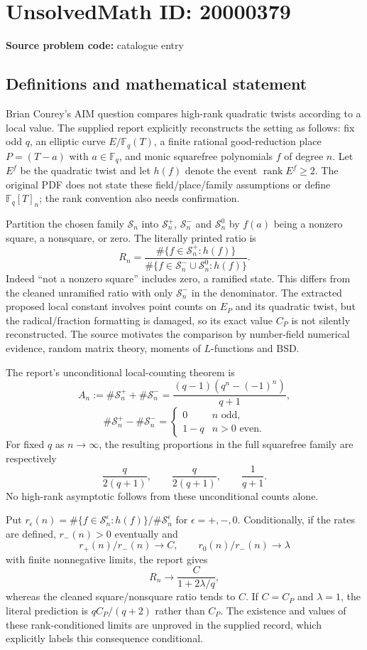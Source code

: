 \documentclass[11pt]{article}
\newcommand{\F}{\mathbb{F}}
\begin{document}
\section*{UnsolvedMath ID: 20000379}
\textbf{Source problem code:} catalogue entry
\subsection{Definitions and mathematical statement}
Brian Conrey's AIM question compares high-rank quadratic twists according to a local value. The supplied report explicitly reconstructs the setting as follows: fix odd $q$, an elliptic curve $E/\F_q(T)$, a finite rational good-reduction place $P=(T-a)$ with $a\in\F_q$, and monic squarefree polynomials $f$ of degree $n$. Let $E^f$ be the quadratic twist and let $h(f)$ denote the event $\operatorname{rank}E^f\geq2$. The original PDF does not state these field/place/family assumptions or define $\F_q[T]_n$; the rank convention also needs confirmation.

Partition the chosen family $\mathcal S_n$ into $\mathcal S_n^+$, $\mathcal S_n^-$ and $\mathcal S_n^0$ by $f(a)$ being a nonzero square, a nonsquare, or zero. The literally printed ratio is
\[
 R_n=\frac{\#\{f\in\mathcal S_n^+:h(f)\}}
 {\#\{f\in\mathcal S_n^-\cup\mathcal S_n^0:h(f)\}}.
\]
Indeed ``not a nonzero square'' includes zero, a ramified state. This differs from the cleaned unramified ratio with only $\mathcal S_n^-$ in the denominator. The extracted proposed local constant involves point counts on $E_P$ and its quadratic twist, but the radical/fraction formatting is damaged, so its exact value $C_P$ is not silently reconstructed. The source motivates the comparison by number-field numerical evidence, random matrix theory, moments of $L$-functions and BSD.

The report's unconditional local-counting theorem is
\[
 A_n:=\#\mathcal S_n^++\#\mathcal S_n^-=
 \frac{(q-1)(q^n-(-1)^n)}{q+1},
\]
\[
 \#\mathcal S_n^+-\#\mathcal S_n^-=
 \begin{cases}0&n\text{ odd},\\1-q&n>0\text{ even}.
 \end{cases}
\]
For fixed $q$ as $n\to\infty$, the resulting proportions in the full squarefree family are respectively
\[
 \frac{q}{2(q+1)},\qquad\frac{q}{2(q+1)},\qquad\frac1{q+1}.
\]
No high-rank asymptotic follows from these unconditional counts alone.

Put $r_\epsilon(n)=\#\{f\in\mathcal S_n^\epsilon:h(f)\}/\#\mathcal S_n^\epsilon$ for $\epsilon=+,-,0$. Conditionally, if the rates are defined, $r_-(n)>0$ eventually and
\[
 r_+(n)/r_-(n)\to C,\qquad r_0(n)/r_-(n)\to\lambda
\]
with finite nonnegative limits, the report gives
\[
 R_n\longrightarrow\frac{C}{1+2\lambda/q},
\]
whereas the cleaned square/nonsquare ratio tends to $C$. If $C=C_P$ and $\lambda=1$, the literal prediction is $qC_P/(q+2)$ rather than $C_P$. The existence and values of these rank-conditioned limits are unproved in the supplied record, which explicitly labels this consequence conditional.
\end{document}
